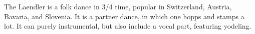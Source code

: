 The Laendler is a folk dance in 3/4 time, popular in Switzerland, Austria, Bavaria, and Slovenia.
It is a partner dance, in which one hopps and stamps a lot.
It can purely instrumental, but also include a vocal part, featuring yodeling.